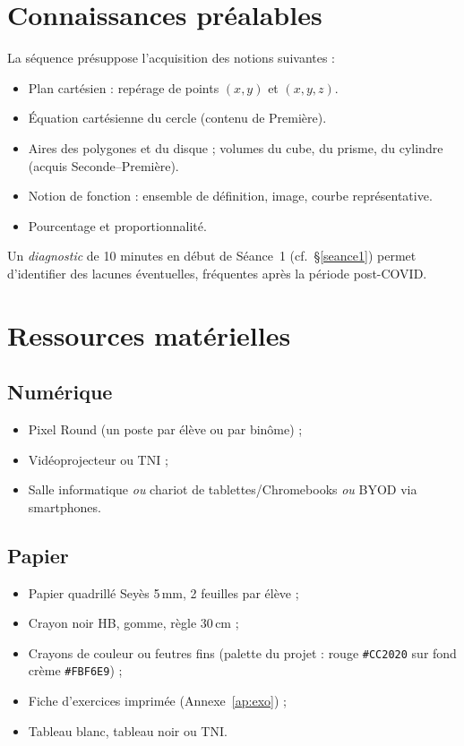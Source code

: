 \documentclass[12pt,a4paper]{scrartcl}
\begin{document}
\section{Connaissances préalables}

La séquence présuppose l'acquisition des notions suivantes :

\begin{itemize}[leftmargin=1.3em,itemsep=0.15em,topsep=0.3em]
  \item Plan cartésien : repérage de points $(x, y)$ et $(x, y, z)$.
  \item Équation cartésienne du cercle (contenu de Première).
  \item Aires des polygones et du disque ; volumes du cube, du prisme, du cylindre (acquis Seconde--Première).
  \item Notion de fonction : ensemble de définition, image, courbe représentative.
  \item Pourcentage et proportionnalité.
\end{itemize}

Un \emph{diagnostic} de 10 minutes en début de Séance~1 (cf.\ §\ref{seance1}) permet d'identifier des lacunes éventuelles, fréquentes après la période post-COVID.

\section{Ressources matérielles}

\subsection{Numérique}
\begin{itemize}[leftmargin=1.3em,itemsep=0.15em,topsep=0.3em]
  \item Pixel Round (un poste par élève ou par binôme) ;
  \item Vidéoprojecteur ou TNI ;
  \item Salle informatique \emph{ou} chariot de tablettes/Chromebooks \emph{ou} BYOD via smartphones.
\end{itemize}

\subsection{Papier}
\begin{itemize}[leftmargin=1.3em,itemsep=0.15em,topsep=0.3em]
  \item Papier quadrillé Seyès 5\,mm, 2 feuilles par élève ;
  \item Crayon noir HB, gomme, règle 30\,cm ;
  \item Crayons de couleur ou feutres fins (palette du projet : rouge \texttt{\#CC2020} sur fond crème \texttt{\#FBF6E9}) ;
  \item Fiche d'exercices imprimée (Annexe~\ref{ap:exo}) ;
  \item Tableau blanc, tableau noir ou TNI.
\end{itemize}
\end{document}
